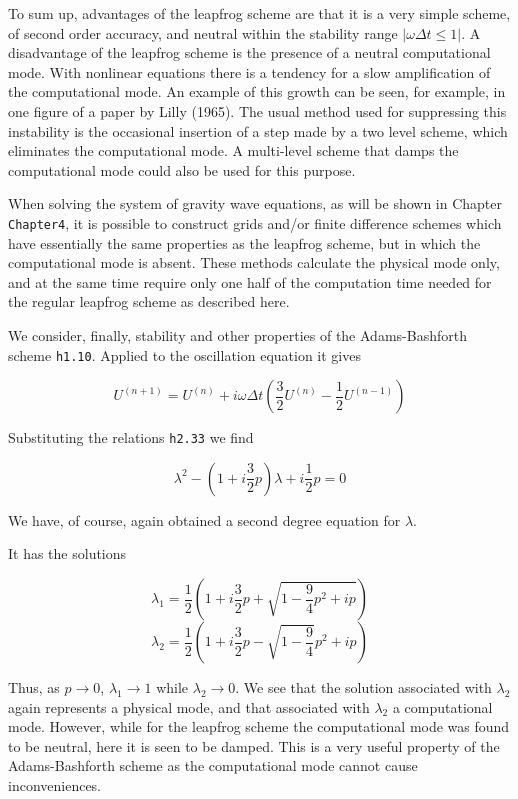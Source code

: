 To sum up, advantages of the leapfrog scheme are that it is a very
simple scheme, of second order accuracy, and neutral within the
stability range \(\left| \omega\Delta t \leq 1 \right|\). A disadvantage
of the leapfrog scheme is the presence of a neutral computational mode.
With nonlinear equations there is a tendency for a slow amplification of
the computational mode. An example of this growth can be seen, for
example, in one figure of a paper by Lilly (1965). The usual method used
for suppressing this instability is the occasional insertion of a step
made by a two level scheme, which eliminates the computational mode. A
multi-level scheme that damps the computational mode could also be used
for this purpose.

When solving the system of gravity wave equations, as will be shown in
Chapter \texttt{Chapter4}, it is possible to construct grids and/or
finite difference schemes which have essentially the same properties as
the leapfrog scheme, but in which the computational mode is absent.
These methods calculate the physical mode only, and at the same time
require only one half of the computation time needed for the regular
leapfrog scheme as described here.

We consider, finally, stability and other properties of the
Adams-Bashforth scheme \texttt{h1.10}. Applied to the oscillation
equation it gives

\[U^{( n + 1 )} = U^{(n)} + i\omega\Delta t \left( \frac{3}{2}U^{( n )} - \frac{1}{2}U^{\left( n - 1 \right)} \right)\]

Substituting the relations \texttt{h2.33} we find

\[\lambda^{2} - \left( 1 + i\frac{3}{2}p \right)\lambda + i\frac{1}{2}p = 0\]

We have, of course, again obtained a second degree equation for
\(\lambda\).

It has the solutions

\[\lambda_{1} = \frac{1}{2}\left( 1 + i\frac{3}{2}p + \sqrt{1 - \frac{9}{4}p^{2} + ip} \right)\]\[\lambda_{2} = \frac{1}{2}\left( 1 + i\frac{3}{2}p - \sqrt{1 - \frac{9}{4}}p^{2} + ip \right)\]

Thus, as \(p \rightarrow 0\), \(\lambda_{1} \rightarrow 1 \) while
\(\lambda_{2} \rightarrow 0\). We see that the solution associated with
\(\lambda_{2}\) again represents a physical mode, and that associated
with \(\lambda_{2}\) a computational mode. However, while for the
leapfrog scheme the computational mode was found to be neutral, here it
is seen to be damped. This is a very useful property of the
Adams-Bashforth scheme as the computational mode cannot cause
inconveniences.

